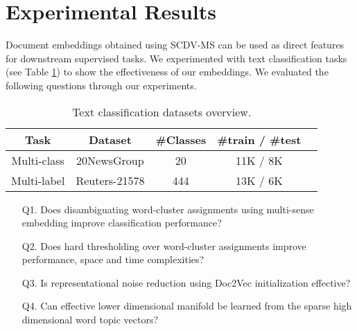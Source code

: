 \documentclass{ecai}
\newcommand{\method}{SCDV-MS}
\begin{document}
\section{Experimental Results}
\label{sec:experiments}

Document embeddings obtained using \method{} can be used as direct features for downstream supervised tasks. We experimented with text classification tasks (see Table \ref{table:expplan}) to show the effectiveness of our embeddings. We evaluated the following questions through our experiments.
\begin{table}
\captionsetup{font=small, skip=0pt}
\vspace{-1.0em}
\caption{Text classification datasets overview.}
\begin{center}
\vspace{-1.0em}
\begin{tabular}{ c c c c c}
\hline
Task & Dataset & \#Classes & \#train / \#test \\ 
\hline
Multi-class & 20NewsGroup & 20 & 11K / 8K\\  
Multi-label & Reuters-21578 & 444 & 13K / 6K \\
\hline
\end{tabular}
\end{center}
\label{table:expplan}
\vspace{-2.4em}
\end{table}

\begin{enumerate}
\item[Q1.] Does disambiguating word-cluster assignments using multi-sense embedding improve classification performance?
\vspace{0.1cm}
\item[Q2.] Does hard thresholding over word-cluster assignments improve performance, space and time complexities? 
\vspace{0.1cm}
\item[Q3.] Is representational noise reduction using Doc2Vec initialization effective? 
\vspace{0.1cm}
\item[Q4.] Can effective lower dimensional manifold be learned from the sparse high dimensional word topic vectors?
\end{enumerate}
\end{document}
